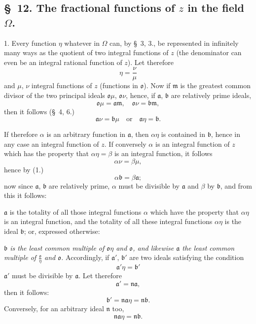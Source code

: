 \documentclass{article}
\begin{document}
\subsection*{§~12. The fractional functions of $z$ in the field $\Omega$.}

1. Every function $\eta$ whatever in $\Omega$ can, by §~3, 3., be represented in infinitely many ways as the quotient of two integral functions of $z$ (the denominator can even be an integral rational function of $z$). Let therefore
\[ \eta = \frac{\nu}{\mu} \]
and $\mu$, $\nu$ integral functions of $z$ (functions in $\mathfrak{o}$). Now if $\mathfrak{m}$ is the greatest common divisor of the two principal ideals $\mathfrak{o}\mu$, $\mathfrak{o}\nu$, hence, if $\mathfrak{a}$, $\mathfrak{b}$ are relatively prime ideals,
\[ \mathfrak{o}\mu = \mathfrak{a}\mathfrak{m}, \quad \mathfrak{o}\nu = \mathfrak{b}\mathfrak{m}, \tag{1.} \]
then it follows (§~4, 6.)
\[ \mathfrak{a}\nu = \mathfrak{b}\mu \quad \text{or} \quad \mathfrak{a}\eta = \mathfrak{b}. \tag{2.} \]

If therefore $\alpha$ is an arbitrary function in $\mathfrak{a}$, then $\alpha\eta$ is contained in $\mathfrak{b}$, hence in any case an integral function of $z$. If conversely $\alpha$ is an integral function of $z$ which has the property that $\alpha\eta = \beta$ is an integral function, it follows
\[ \alpha\nu = \beta\mu, \]
hence by (1.)
\[ \alpha\mathfrak{b} = \beta\mathfrak{a}; \]
now since $\mathfrak{a}$, $\mathfrak{b}$ are relatively prime, $\alpha$ must be divisible by $\mathfrak{a}$ and $\beta$ by $\mathfrak{b}$, and from this it follows:


$\mathfrak{a}$ is the totality of all those integral functions $\alpha$ which have the property that $\alpha\eta$ is an integral function, and the totality of all these integral functions $\alpha\eta$ is the ideal $\mathfrak{b}$; or, expressed otherwise:

\emph{$\mathfrak{b}$ is the least common multiple of $\mathfrak{o}\eta$ and $\mathfrak{o}$, and likewise $\mathfrak{a}$ the least common multiple of $\frac{\mathfrak{o}}{\eta}$ and $\mathfrak{o}$.} Accordingly, if $\mathfrak{a}'$, $\mathfrak{b}'$ are two ideals satisfying the condition
\[ \mathfrak{a}'\eta = \mathfrak{b}' \]
$\mathfrak{a}'$ must be divisible by $\mathfrak{a}$. Let therefore
\[ \mathfrak{a}' = \mathfrak{n}\mathfrak{a}, \]
then it follows:
\[ \mathfrak{b}' = \mathfrak{n}\mathfrak{a}\eta = \mathfrak{n}\mathfrak{b}. \]
Conversely, for an arbitrary ideal $\mathfrak{n}$ too,
\[ \mathfrak{n}\mathfrak{a}\eta = \mathfrak{n}\mathfrak{b}. \]
\end{document}
